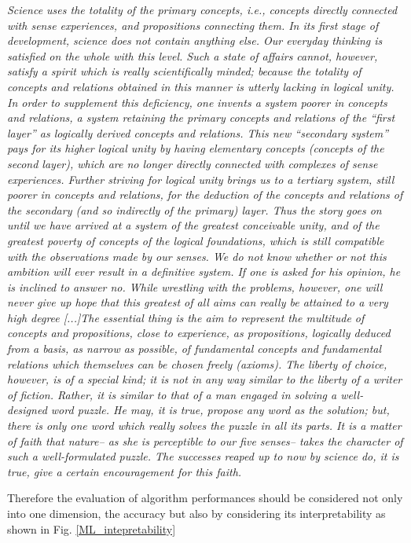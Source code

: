 \documentclass[12pt,%
               a4paper,%
               oneside,openany,%
               titlepage,%
               headinclude,footinclude,%
               BCOR5mm,%
               cleardoublepage=empty,%
               tablecaptionabove,%
               floatperchapter,
               ]{scrreprt}                 %
\begin{document}
\begin{displayquote}
\textit{Science uses the totality of the primary concepts, i.e., concepts directly connected with sense experiences, and propositions connecting them. In its first stage of development, science does not contain anything else. Our everyday thinking is satisfied on the whole with this level. Such a state of affairs cannot, however, satisfy a spirit which is really scientifically minded; because the totality of concepts and relations obtained in this manner is utterly lacking in logical unity. In order to supplement this deficiency, one invents a system poorer in concepts and relations, a system retaining the primary concepts and relations of the “first layer” as logically derived concepts and relations. This new “secondary system” pays for its higher logical unity by having elementary concepts (concepts of the second layer), which are no longer directly connected with complexes of sense experiences. Further striving for logical unity brings us to a tertiary system, still poorer in concepts and relations, for the deduction of the concepts and relations of the secondary (and so indirectly of the primary) layer. Thus the story goes on until we have arrived at a system of the greatest conceivable unity, and of the greatest poverty of concepts of the logical foundations, which is still compatible with the observations made by our senses. We do not know whether or not this ambition will ever result in a definitive system. If one is asked for his opinion, he is inclined to answer no. While wrestling with the problems, however, one will never give up hope that this greatest of all aims can really be attained to a very high degree [...]The essential thing is the aim to represent the multitude of concepts and propositions, close to experience, as propositions, logically deduced from a basis, as narrow as possible, of fundamental concepts and fundamental relations which themselves can be chosen freely (axioms). The liberty of choice, however, is of a special kind; it is not in any way similar to the liberty of a writer of fiction. Rather, it is similar to that of a man engaged in solving a well-designed word puzzle. He may, it is true, propose any word as the solution; but, there is only one word which really solves the puzzle in all its parts. It is a matter of faith that nature– as she is perceptible to our five senses– takes the character of such a well-formulated puzzle. The successes reaped up to now by science do, it is true, give a certain encouragement for this faith.}
\end{displayquote}
Therefore the evaluation of algorithm performances should be considered not only into one dimension, the accuracy but also by considering its interpretability as shown in Fig. \ref{ML_intepretability}
\end{document}
